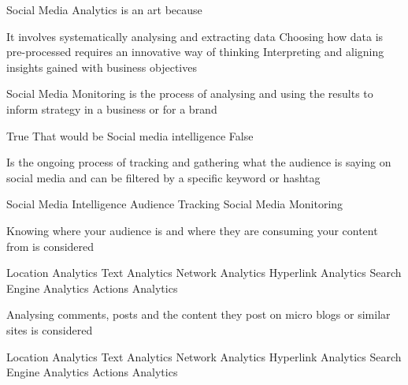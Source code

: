 \documentclass[theme=sleek, randomorder, hidesidemenu]{webquiz}
\begin{document}
\begin{question}
  Social Media Analytics is an art because
  \begin{choice}[columns=2]
    \incorrect It involves systematically analysing and extracting data
    \incorrect Choosing how data is pre-processed requires an innovative way of thinking
    \correct Interpreting and aligning insights gained with business objectives
  \end{choice}
\end{question}

\begin{question}
  Social Media Monitoring is the process of analysing and using the results to inform strategy in a business or for a brand
  \begin{choice}[columns=2]
    \incorrect True
    \feedback That would be Social media intelligence
    \correct False
  \end{choice}
\end{question}

\begin{question}
  Is the ongoing process of tracking and gathering what the audience is saying on social media and can be filtered by a specific keyword or hashtag
  \begin{choice}[columns=2]
    \incorrect Social Media Intelligence
    \incorrect Audience Tracking
    \correct Social Media Monitoring
  \end{choice}
\end{question}

\begin{question}
  Knowing where your audience is and where they are consuming your content from is considered
  \begin{choice}[columns=2]
    \correct Location Analytics
    \incorrect Text Analytics
    \incorrect Network Analytics
    \incorrect Hyperlink Analytics
    \incorrect Search Engine Analytics
    \incorrect Actions Analytics
  \end{choice}
\end{question}

\begin{question}
  Analysing comments, posts and the content they post on micro blogs or similar sites is considered
  \begin{choice}[columns=2]
    \incorrect Location Analytics
    \correct Text Analytics
    \incorrect Network Analytics
    \incorrect Hyperlink Analytics
    \incorrect Search Engine Analytics
    \incorrect Actions Analytics
  \end{choice}
\end{question}
\end{document}
